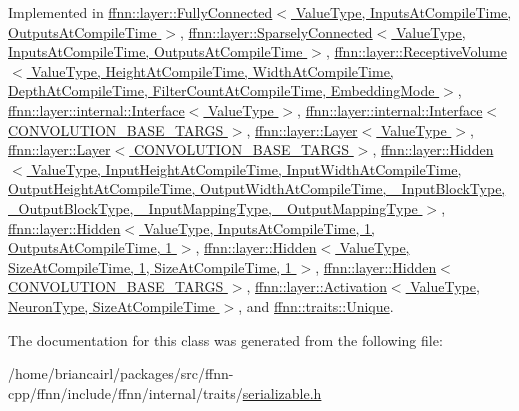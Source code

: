 Implemented in \hyperlink{classffnn_1_1layer_1_1_fully_connected_a858f04f0752096d74e4d9876edb4c73e}{ffnn\-::layer\-::\-Fully\-Connected$<$ Value\-Type, Inputs\-At\-Compile\-Time, Outputs\-At\-Compile\-Time $>$}, \hyperlink{classffnn_1_1layer_1_1_sparsely_connected_aa8ae358e7cf06b58f3d33be2851d0260}{ffnn\-::layer\-::\-Sparsely\-Connected$<$ Value\-Type, Inputs\-At\-Compile\-Time, Outputs\-At\-Compile\-Time $>$}, \hyperlink{classffnn_1_1layer_1_1_receptive_volume_a9f813e0c5c60d572a296b8ec1fc25086}{ffnn\-::layer\-::\-Receptive\-Volume$<$ Value\-Type, Height\-At\-Compile\-Time, Width\-At\-Compile\-Time, Depth\-At\-Compile\-Time, Filter\-Count\-At\-Compile\-Time, Embedding\-Mode $>$}, \hyperlink{classffnn_1_1layer_1_1internal_1_1_interface_a417d6fda112fdffed8091b0ebd78ed97}{ffnn\-::layer\-::internal\-::\-Interface$<$ Value\-Type $>$}, \hyperlink{classffnn_1_1layer_1_1internal_1_1_interface_a417d6fda112fdffed8091b0ebd78ed97}{ffnn\-::layer\-::internal\-::\-Interface$<$ C\-O\-N\-V\-O\-L\-U\-T\-I\-O\-N\-\_\-\-B\-A\-S\-E\-\_\-\-T\-A\-R\-G\-S $>$}, \hyperlink{classffnn_1_1layer_1_1_layer_ac265fc929a178b111337226dd1cb62b6}{ffnn\-::layer\-::\-Layer$<$ Value\-Type $>$}, \hyperlink{classffnn_1_1layer_1_1_layer_ac265fc929a178b111337226dd1cb62b6}{ffnn\-::layer\-::\-Layer$<$ C\-O\-N\-V\-O\-L\-U\-T\-I\-O\-N\-\_\-\-B\-A\-S\-E\-\_\-\-T\-A\-R\-G\-S $>$}, \hyperlink{classffnn_1_1layer_1_1_hidden_a98305185267a0f7953f1b53c4bce4cf6}{ffnn\-::layer\-::\-Hidden$<$ Value\-Type, Input\-Height\-At\-Compile\-Time, Input\-Width\-At\-Compile\-Time, Output\-Height\-At\-Compile\-Time, Output\-Width\-At\-Compile\-Time, \-\_\-\-Input\-Block\-Type, \-\_\-\-Output\-Block\-Type, \-\_\-\-Input\-Mapping\-Type, \-\_\-\-Output\-Mapping\-Type $>$}, \hyperlink{classffnn_1_1layer_1_1_hidden_a98305185267a0f7953f1b53c4bce4cf6}{ffnn\-::layer\-::\-Hidden$<$ Value\-Type, Inputs\-At\-Compile\-Time, 1, Outputs\-At\-Compile\-Time, 1 $>$}, \hyperlink{classffnn_1_1layer_1_1_hidden_a98305185267a0f7953f1b53c4bce4cf6}{ffnn\-::layer\-::\-Hidden$<$ Value\-Type, Size\-At\-Compile\-Time, 1, Size\-At\-Compile\-Time, 1 $>$}, \hyperlink{classffnn_1_1layer_1_1_hidden_a98305185267a0f7953f1b53c4bce4cf6}{ffnn\-::layer\-::\-Hidden$<$ C\-O\-N\-V\-O\-L\-U\-T\-I\-O\-N\-\_\-\-B\-A\-S\-E\-\_\-\-T\-A\-R\-G\-S $>$}, \hyperlink{classffnn_1_1layer_1_1_activation_ab5525e49c08fc593856b9c95e0eba1ee}{ffnn\-::layer\-::\-Activation$<$ Value\-Type, Neuron\-Type, Size\-At\-Compile\-Time $>$}, and \hyperlink{classffnn_1_1traits_1_1_unique_ad8be6fcb9a7519603b2aab19b3c6d593}{ffnn\-::traits\-::\-Unique}.



The documentation for this class was generated from the following file\-:\begin{DoxyCompactItemize}
\item 
/home/briancairl/packages/src/ffnn-\/cpp/ffnn/include/ffnn/internal/traits/\hyperlink{serializable_8h}{serializable.\-h}\end{DoxyCompactItemize}
